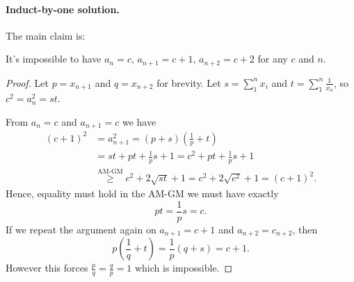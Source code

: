 \paragraph{Induct-by-one solution.}
The main claim is:
\begin{claim*}
  It's impossible to have
  $a_n = c$, $a_{n+1} = c+1$, $a_{n+2} = c+2$ for any $c$ and $n$.
\end{claim*}
\begin{proof}
  Let $p = x_{n+1}$ and $q = x_{n+2}$ for brevity.
  Let $s = \sum_1^n x_i$ and $t = \sum_1^n \frac{1}{x_n}$, so $c^2 = a_n^2 = st$.

  From $a_n = c$ and $a_{n+1} = c$ we have
  \begin{align*}
    (c+1)^2 &= a_{n+1}^2 = (p+s)\left( \frac 1p+t \right) \\
    &= st + pt + \frac1ps + 1 = c^2 + pt + \frac1ps + 1 \\
    &\overset{\text{AM-GM}}{\geq} c^2 + 2\sqrt{st} + 1 = c^2 + 2\sqrt{c^2} + 1 = (c+1)^2.
  \end{align*}
  Hence, equality must hold in the AM-GM we must have exactly
  \[ p t = \frac 1p s = c. \]
  If we repeat the argument again on $a_{n+1}=c+1$ and $a_{n+2}=c_{n+2}$, then
  \[ p \left( \frac 1q + t \right) = \frac 1p \left( q + s \right) = c + 1. \]
  However this forces $\frac pq = \frac qp = 1$ which is impossible.
\end{proof}
